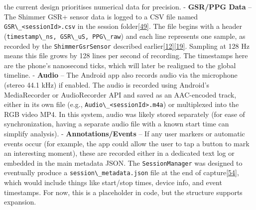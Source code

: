 \documentclass[12pt,a4paper]{article}
\begin{document}
the current design prioritises numerical data for precision. - \textbf{GSR/PPG Data} -- The Shimmer GSR+ sensor data is logged to a CSV file named \passthrough{\lstinline!GSR\_<sessionId>.csv!} in the session folder\href{https://github.com/buccancs/GSR-Dual-Video-System/blob/05ae360cb7b4ae7c7861f72deb235ad64a74b38e/android/app/src/main/java/com/yourcompany/gsrcapture/manager/SessionManager.kt\#L26-L34}{{[}49{]}}. The file begins with a header (\passthrough{\lstinline!timestamp\_ns, GSR\_uS, PPG\_raw!}) and each line represents one sample, as recorded by the \passthrough{\lstinline!ShimmerGsrSensor!} described earlier\href{https://github.com/buccancs/GSR-Dual-Video-System/blob/05ae360cb7b4ae7c7861f72deb235ad64a74b38e/android/app/src/main/java/com/yourcompany/gsrcapture/hardware/ShimmerGsrSensor.kt\#L52-L60}{{[}12{]}}\href{https://github.com/buccancs/GSR-Dual-Video-System/blob/05ae360cb7b4ae7c7861f72deb235ad64a74b38e/android/app/src/main/java/com/yourcompany/gsrcapture/hardware/ShimmerGsrSensor.kt\#L103-L111}{{[}19{]}}. Sampling at 128 Hz means this file grows by 128 lines per second of recording. The timestamps here are the phone's nanosecond ticks, which will later be realigned to the global timeline. - \textbf{Audio} -- The Android app also records audio via the microphone (stereo 44.1 kHz) if enabled. The audio is recorded using Android's MediaRecorder or AudioRecorder API and saved as an AAC-encoded track, either in its own file (e.g., \passthrough{\lstinline!Audio\_<sessionId>.m4a!}) or multiplexed into the RGB video MP4. In this system, audio was likely stored separately (for ease of synchronization, having a separate audio file with a known start time can simplify analysis). - \textbf{Annotations/Events} -- If any user markers or automatic events occur (for example, the app could allow the user to tap a button to mark an interesting moment), these are recorded either in a dedicated text log or embedded in the main metadata JSON. The \passthrough{\lstinline!SessionManager!} was designed to eventually produce a \passthrough{\lstinline!session\_metadata.json!} file at the end of capture\href{https://github.com/buccancs/GSR-Dual-Video-System/blob/05ae360cb7b4ae7c7861f72deb235ad64a74b38e/android/app/src/main/java/com/yourcompany/gsrcapture/manager/SessionManager.kt\#L40-L47}{{[}54{]}}, which would include things like start/stop times, device info, and event timestamps. For now, this is a placeholder in code, but the structure supports expansion.
\end{document}
